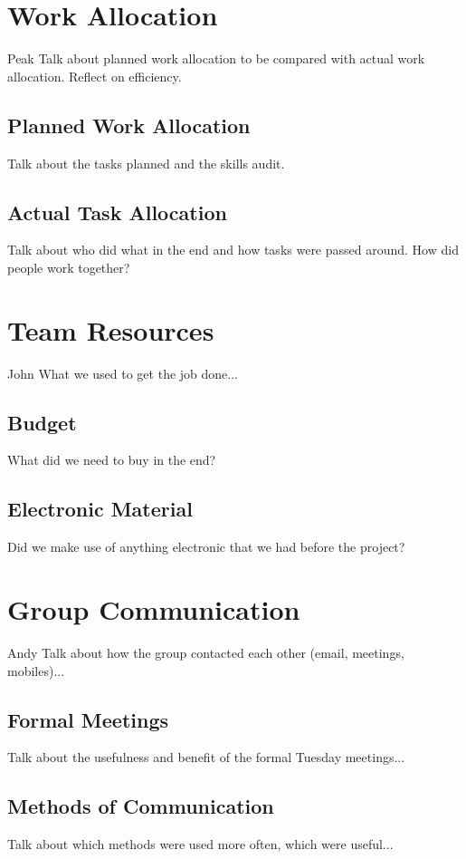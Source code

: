 \documentclass[oneside]{ecsgdp}         %
\begin{document}
\section{Work Allocation}
Peak
Talk about planned work allocation to be compared with actual work allocation. Reflect on efficiency.

\subsection{Planned Work Allocation}
Talk about the tasks planned and the skills audit.

\subsection{Actual Task Allocation}
Talk about who did what in the end and how tasks were passed around. How did people work together?

\section{Team Resources}
John
What we used to get the job done...

\subsection{Budget}
What did we need to buy in the end?

\subsection{Electronic Material}
Did we make use of anything electronic that we had before the project?

\section{Group Communication}
Andy
Talk about how the group contacted each other (email, meetings, mobiles)...

\subsection{Formal Meetings}
Talk about the usefulness and benefit of the formal Tuesday meetings...

\subsection{Methods of Communication}
Talk about which methods were used more often, which were useful...
\end{document}
